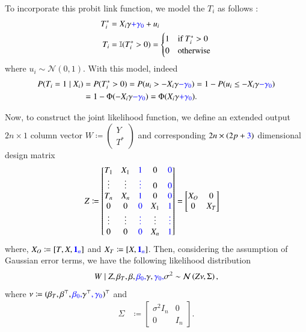 \documentclass[preprint,12pt]{elsarticle}
\newcommand{\normal}{\mathcal{N}}
\newcommand{\added}[1]{\textcolor{blue}{#1}}
\begin{document}
To incorporate this probit
link function, we model the $T_i$ as follows \citep{albert93}:
\begin{align}
    T_i^* &= X_i\gamma\added{+\gamma_0} +u_i \\
    T_i   &= \mathbb{I}(T_i^*>0)
    =
    \begin{cases}
    1 & \text{if }T_i^*>0 \\
    0 & \text{otherwise}
    \end{cases}
\end{align}
where $u_i\sim\mathcal{N}(0,1)$.
With this model, indeed
\begin{align}
  P(T_i=1\mid X_i)
  &=P(T_i^*>0)=P(u_i>-X_i\gamma\added{-\gamma_0})=1-P(u_i\le -X_i\gamma\added{-\gamma_0}) \\
  &=1-\Phi(-X_i\gamma\added{-\gamma_0})=\Phi(X_i\gamma\added{+\gamma_0}).
\end{align}

Now, to construct the joint likelihood function, we define an extended
output $2n\times 1$ column vector
$W\coloneqq\left(\begin{smallmatrix}Y \\ T^*\end{smallmatrix}\right)$
and corresponding $2n\times(2p+\added{3})$ dimensional design matrix
\begin{align}
	Z &\coloneqq
        \begin{bmatrix}
           T_1 & X_1 & \added{1} & 0 & \added{0} \\
           \vdots & \vdots & \added{\vdots} & 0 & \added{0} \\
           T_n & X_n & \added{1} & 0 & \added{0} \\
           0 & 0 & \added{0} & X_1 & \added{1} \\
           \vdots & \vdots & \added{\vdots} & \vdots & \added{\vdots} \\
           0 & 0 & \added{0} & X_n & \added{1}
        \end{bmatrix}
        =
	\begin{bmatrix}
		X_O & 0 \\
		0 & X_T
	\end{bmatrix}
\end{align}
where, $X_O \coloneqq [T, X, \added{\mathbf{1}_n}]$ and $X_T \coloneqq [X, \added{\mathbf{1}_n}]$. Then, considering the assumption of
Gaussian error terms, we have the following likelihood distribution
\begin{align}
	W\mid Z, \beta_T, \beta, \added{\beta_0,} \gamma, \added{\gamma_0,} \sigma^2 \sim\normal\left(Z\nu, \Sigma\right)\label{eq:like:group},
\end{align}
where $\nu \coloneqq (\beta_T, \beta^{\top}, \added{\beta_0,} \gamma^{\top}\added{, \gamma_0})^{\top}$ and
\begin{align}
	\Sigma &\coloneqq
	\begin{bmatrix}
		\sigma^2{I}_n & 0 \\
		0 & {I}_n
	\end{bmatrix}.
\end{align}
\end{document}
